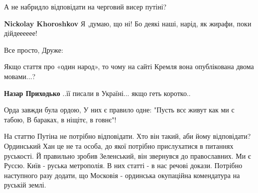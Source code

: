 \begin{itemize}
А не набридло відповідати на черговий висер путіні?

\begin{itemize}
 
\textbf{Nickolay Khoroshkov} Я ,думаю, що ні! Бо деякі наші, нарід, як жирафи, поки дійдееееее!
\end{itemize}

 

Все просто, Друже:

Якщо стаття про «один народ», то чому на сайті Кремля вона опублікована двома
мовами...?

\begin{itemize}
 
\textbf{Назар Приходько} ..її писали в Україні... якщо геть коротко..
\end{itemize}

 

\obeycr
Орда завжди була ордою,
У них є правило одне:
"Пусть всє живут как ми с табою,
В бараках, в ніщітє, в говнє"!
\restorecr


 

На статтю Путіна не потрібно відповідати. Хто він такий, аби йому відповідати?
Ординський Хан це не та особа, до якої потрібно прислухатися в питаннях
руськості. Й правильно зробив Зеленський, він звернувся до православних. Ми є
Руссю. Київ - руська метрополія. В них статті - в нас речові докази. Потрібно
наступного разу додати, що Московія - ординська окупаційна комендатура на
руській землі.


\end{itemize}
